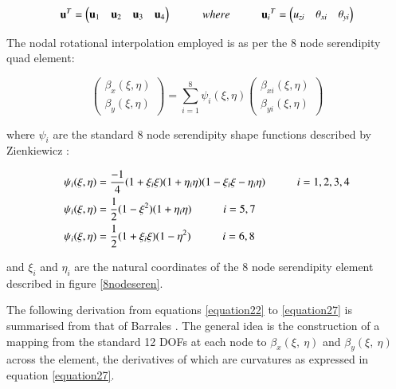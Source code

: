 \begin{equation} 
\mathbf{u}^T = 
\begin{pmatrix}
\mathbf{u}_1 & \mathbf{u}_2 & \mathbf{u}_3 & \mathbf{u}_4
\end{pmatrix} 
\hspace{10mm}
where
\hspace{10mm}
\mathbf{u}{_i}^T = 
\begin{pmatrix}
{u_{zi}} & {\theta_{xi}} & {\theta_{yi}}
\end{pmatrix}
\label{equationBending}
\end{equation}

The nodal rotational interpolation employed is as per the 8 node serendipity quad element:

\begin{equation} 
\begin{pmatrix}
\beta_x (\xi , \eta) \\
\beta_y (\xi , \eta)
\end{pmatrix}
= \sum_{i=1}^8 \psi_i (\xi , \eta) 
\begin{pmatrix}
\beta_{xi} (\xi , \eta) \\
\beta_{yi} (\xi , \eta)
\end{pmatrix}
\label{equation20}
\end{equation}

where $\psi_i$ are the standard 8 node serendipity shape functions described by Zienkiewicz \cite{Zie77}:

\begin{gather} 
	\begin{aligned}
		&\psi_i (\xi , \eta) = \frac{-1}{4} (1 + \xi_i \xi)(1 + \eta_i \eta)(1 - \xi_i \xi - \eta_i \eta)
		\hspace{10mm}
		i = 1, 2, 3, 4 \\
		&\psi_i (\xi , \eta) = \frac{1}{2} (1 - \xi^2)(1 + \eta_i \eta)
		\hspace{10mm}
		i = 5, 7 \\
		&\psi_i (\xi , \eta) = \frac{1}{2} (1 + \xi_i \xi)(1 - \eta^2)
		\hspace{10mm}
		i = 6, 8
		\label{equation21}
	\end{aligned}
\end{gather}

and $\xi_i$ and $\eta_i$ are the natural coordinates of the 8 node serendipity element described in figure \ref{8nodeseren}.

The following derivation from equations \eqref{equation22} to \eqref{equation27} is summarised from that of Barrales \cite{Bar12}. The general idea is the construction of a mapping from the standard 12 DOFs at each node to $\beta_x (\xi,\ \eta)$ and $\beta_y (\xi,\ \eta)$ across the element, the derivatives of which are curvatures as expressed in equation \eqref{equation27}.

